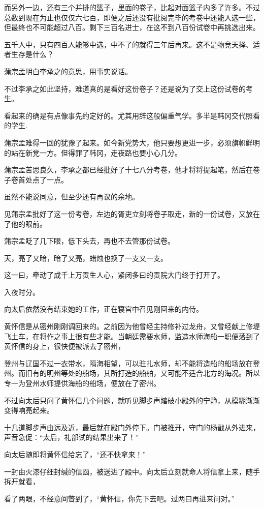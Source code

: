 而另外一边，还有三个并排的篮子，里面的卷子，比起对面篮子内多了许多。不过总数到现在为止也仅仅六七百，即便之后还没有批阅完毕的考卷中还能入选一些，但最终也不可能超过八百。剩下三百名进士，在这不到八百份试卷中再挑选出来。

五千人中，只有四百人能够中选，中不了的就得三年后再来。这不是物竞天择、适者生存是什么？

蒲宗孟明白李承之的意思，用事实说话。

不过李承之如此坚持，难道真的是看好这份卷子？还是说为了交上这份试卷的考生。

看起来的确是有点像事先约定好的。尤其用辞这般偏重气学。多半是韩冈交代照看的学生.

蒲宗孟难得一回的犹豫了起来。如今新党势大，他只要想更进一步，必须旗帜鲜明的站在新党一方。但得罪了韩冈，走夜路也要小心几分。

蒲宗孟苦思良久，李承之都已经批好了十七八分考卷，他才将将提起笔，然后在卷子卷首处点了一点。

虽然不能说同意，但至少还有再议的余地。

见蒲宗孟批好了这一份考卷，左边的胥吏立刻将卷子取走，新的一份试卷，又放在了他的眼前。

蒲宗孟眨了几下眼，低下头去，再也不去管那份试卷。

天，亮了又暗，暗了又亮，蜡烛也换了一支又一支。

这一曰，牵动了成千上万贡生人心，紧闭多曰的贡院大门终于打开了。

入夜时分。

向太后依然没有结束她的工作，正在寝宫中召见刚回来的内侍。

黄怀信是从密州刚刚调回来的。之前因为他曾经主持修补过龙舟，又曾经献上修堤飞土车，在将作之事上很有些才能。当朝廷需要水师，监造水师海船一职便落到了黄怀信的身上，很快便被派去了密州，

登州与辽国不过一衣带水，隔海相望，可以驻扎水师，却不能将造船的船场放在登州。而旧有的明州等处的船场，其所打造的船舶，又可能不适合北方的海况。所以专一为登州水师提供海船的船场，便放在了密州。

不过向太后只问了黄怀信几个问题，就听见脚步声踏破小殿外的宁静，从模糊渐渐变得响亮起来。

十几道脚步声由远及近，最后就在殿门外停下。门被推开，守门的杨戬从外进来，声音急促：“太后，礼部试的结果出来了！”

向太后随即将黄怀信给忘了，“还不快拿来！”

一封由火漆仔细封缄的信函，被送进了殿中。向太后立刻就命人将信拿上来，随手拆开就看，

看了两眼，不经意间瞥到了，“黄怀信，你先下去吧。过两曰再进来问对。”

